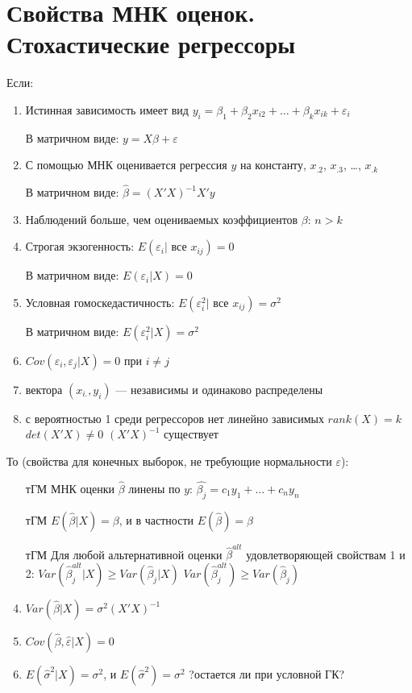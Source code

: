 \documentclass[12pt,a4paper]{article}
\begin{document}
\section*{Свойства МНК оценок. Стохастические регрессоры}

Если:
\begin{enumerate}
\item Истинная зависимость имеет вид $y_i=\beta_1 + \beta_2 x_{i2} + \ldots + \beta_k x_{ik}+\varepsilon_i$

В матричном виде: $y=X\beta + \varepsilon$
\item С помощью МНК оценивается регрессия $y$ на константу, $x_{.2}$, $x_{.3}$, \ldots, $x_{.k}$

В матричном виде: $\hat{\beta}=(X'X)^{-1}X'y$
\item Наблюдений больше, чем оцениваемых коэффициентов $\beta$: $n>k$
\item Строгая экзогенность: $E(\varepsilon_i | \text{ все } x_{ij})=0$

В матричном виде: $E(\varepsilon_i | X)=0$
\item Условная гомоскедастичность: $E(\varepsilon_i^2 | \text{ все } x_{ij})=\sigma^2$

В матричном виде: $E(\varepsilon_i^2 | X)=\sigma^2$
\item  $Cov(\varepsilon_i,\varepsilon_j | X)=0$ при $i \neq j$
\item  вектора $(x_{i.},y_i)$ --- независимы и одинаково распределены
\item  с вероятностью 1 среди регрессоров нет линейно зависимых
$rank(X)=k$
$det(X'X)\neq 0$
$(X'X)^{-1}$ существует
\end{enumerate}

То (свойства для конечных выборок, не требующие нормальности $\varepsilon$):
\begin{enumerate}
\item [тГМ] МНК оценки $\hat{\beta}$ линены по $y$:
$\hat{\beta_j}=c_1 y_1 + ... + c_n y_n$
\item  [тГМ] $E(\hat{\beta} |X )=\beta$, и в частности $E(\hat{\beta})=\beta$
\item  [тГМ] Для любой альтернативной оценки $\hat{\beta}^{alt}$ удовлетворяющей свойствам 1 и 2:
$Var(\hat{\beta}_j^{alt} | X)\geq Var(\hat{\beta}_j | X)$
$Var(\hat{\beta}_j^{alt} )\geq Var(\hat{\beta}_j )$
\item  $Var(\hat{\beta} | X )=\sigma^2 (X'X)^{-1}$
\item $Cov(\hat{\beta},\hat{\varepsilon} | X)=0$
\item  $E(\hat{\sigma}^2 |X ) = \sigma^2$, и $E(\hat{\sigma}^2 ) = \sigma^2$ ?остается ли при условной ГК?
\end{enumerate}
\end{document}
